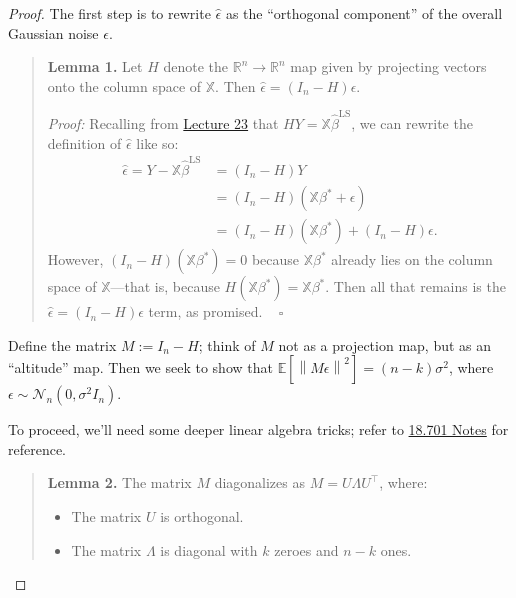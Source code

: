 \begin{proof}
    The first step is to rewrite $\hat{\epsilon}$
    as the ``orthogonal component''
    of the overall Gaussian noise $\epsilon$.

    \begin{quote}
        \textbf{Lemma 1.}
        Let $H$ denote the $\mathbb{R}^n \to \mathbb{R}^n$ map
        given by projecting vectors onto the column space of $\mathbb{X}$.
        Then $\hat{\epsilon} = (I_n - H)\epsilon$.

        \emph{Proof:}
        Recalling from \href{/18.650/lectures/23/#interpreting-the-ls-solution}{Lecture 23}
        that $HY = \mathbb{X}\hat{\beta}^{\mathrm{LS}}$,
        we can rewrite the definition of $\hat{\epsilon}$ like so:
        \begin{align*}
            \hat{\epsilon}
        = Y - \mathbb{X}\hat{\beta}^{\mathrm{LS}}
        & = (I_n - H)Y \\
        & = (I_n - H)(\mathbb{X}\beta^* + \epsilon) \\
        & = (I_n - H)(\mathbb{X}\beta^*) +
        (I_n - H)\epsilon.
        \end{align*}
        However, $(I_n - H)(\mathbb{X}\beta^*) = 0$ because
        $\mathbb{X}\beta^*$ already lies on
        the column space of $\mathbb{X}$---that is,
        because $H(\mathbb{X}\beta^*) = \mathbb{X}\beta^*$.
        Then all that remains is the $\hat{\epsilon} = (I_n - H)\epsilon$
        term, as promised. ~ $\square$
    \end{quote}

    Define the matrix $M := I_n - H$;
    think of $M$ not as a projection map,
    but as an ``altitude'' map.
    Then we seek to show that
    $\mathbb{E}\left[\left\|M\epsilon\right\|^2\right] = (n - k) \sigma^2$,
    where $\epsilon \sim \mathcal{N}_n(0, \sigma^2 I_n)$.

    To proceed, we'll need some deeper linear algebra tricks; refer to
    \href{/18.701/lectures/18/#the-spectral-theorem}{18.701 Notes}
    for reference.

    \begin{quote}
        \textbf{Lemma 2.}
        The matrix $M$ diagonalizes as $M = U\Lambda U^{\top}$, where:
        \begin{itemize}
            \item The matrix $U$ is orthogonal.
            \item The matrix $\Lambda$ is diagonal
            with $k$ zeroes and $n - k$ ones.
        \end{itemize}


\end{quote}
\end{proof}
